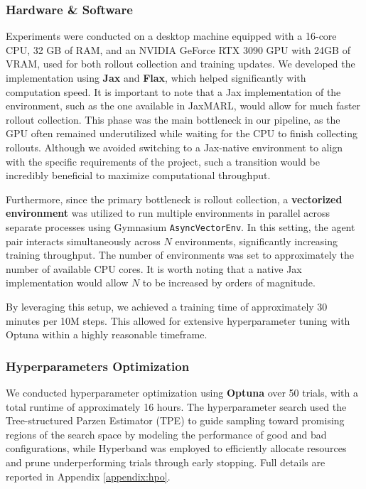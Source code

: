 \documentclass{article}
\begin{document}
\subsubsection{Hardware \& Software} 

Experiments were conducted on a desktop machine equipped with a 16-core CPU,
32 GB of RAM, and an NVIDIA GeForce RTX 3090 GPU with 24GB of VRAM, used for
both rollout collection and training updates. We developed the implementation
using \textbf{Jax} and \textbf{Flax}, which helped significantly with
computation speed. It is important to note that a Jax implementation of the
environment, such as the one available in JaxMARL, would allow for much faster
rollout collection. This phase was the main bottleneck in our pipeline, as the
GPU often remained underutilized while waiting for the CPU to finish
collecting rollouts. Although we avoided switching to a Jax-native environment
to align with the specific requirements of the project, such a transition
would be incredibly beneficial to maximize computational throughput.

Furthermore, since the primary bottleneck is rollout collection, a
\textbf{vectorized environment} was utilized to run multiple environments in
parallel across separate processes using Gymnasium \texttt{AsyncVectorEnv}.
In this setting, the agent pair interacts simultaneously across $N$
environments, significantly increasing training throughput. The number of
environments was set to approximately the number of available CPU cores. It is
worth noting that a native Jax implementation would allow $N$ to be increased
by orders of magnitude.

By leveraging this setup, we achieved a training time of approximately 30
minutes per 10M steps. This allowed for extensive hyperparameter tuning with
Optuna within a highly reasonable timeframe.

\subsubsection{Hyperparameters Optimization}

We conducted hyperparameter optimization using \textbf{Optuna} over 50 trials,
with a total runtime of approximately 16 hours. The hyperparameter search used
the Tree-structured Parzen Estimator (TPE) to guide sampling toward promising
regions of the search space by modeling the performance of good and bad
configurations, while Hyperband was employed to efficiently allocate resources
and prune underperforming trials through early stopping. Full details are
reported in Appendix \ref{appendix:hpo}.
\end{document}
